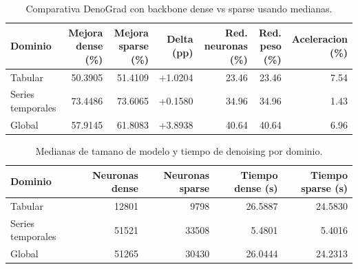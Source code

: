 
\begin{table}[ht]
\centering
\small
\begin{tabular}{lrrrrrr}
\hline
Dominio & Mejora dense (\%) & Mejora sparse (\%) & Delta (pp) & Red. neuronas (\%) & Red. peso (\%) & Aceleracion (\%) \\
\hline
Tabular & 50.3905 & 51.4109 & +1.0204 & 23.46 & 23.46 & 7.54 \\
Series temporales & 73.4486 & 73.6065 & +0.1580 & 34.96 & 34.96 & 1.43 \\
Global & 57.9145 & 61.8083 & +3.8938 & 40.64 & 40.64 & 6.96 \\
\hline
\end{tabular}
\caption{Comparativa DenoGrad con backbone dense vs sparse usando medianas.}
\label{tab:denograd_sparse_median}
\end{table}

\begin{table}[ht]
\centering
\small
\begin{tabular}{lrrrr}
\hline
Dominio & Neuronas dense & Neuronas sparse & Tiempo dense (s) & Tiempo sparse (s) \\
\hline
Tabular & 12801 & 9798 & 26.5887 & 24.5830 \\
Series temporales & 51521 & 33508 & 5.4801 & 5.4016 \\
Global & 51265 & 30430 & 26.0444 & 24.2313 \\
\hline
\end{tabular}
\caption{Medianas de tamano de modelo y tiempo de denoising por dominio.}
\label{tab:denograd_sparse_size_time}
\end{table}

